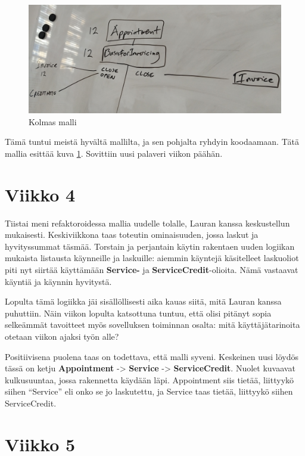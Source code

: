 \begin{figure}
\centering
\includegraphics[width=\textwidth,height=0.5\textheight]{illustration/malli3.jpg}
\caption{\label{malli3}Kolmas malli}
\end{figure}

Tämä tuntui meistä hyvältä mallilta, ja sen pohjalta ryhdyin koodaamaan.
Tätä mallia esittää kuva \ref{malli3}. Sovittiin uusi palaveri viikon
päähän.

\hypertarget{viikko-4}{%
\section{Viikko 4}\label{viikko-4}}

Tiistai meni refaktoroidessa mallia uudelle tolalle, Lauran kanssa
keskustellun mukaisesti. Keskiviikkona taas toteutin ominaisuuden, jossa
laskut ja hyvityssummat täsmää. Torstain ja perjantain käytin rakentaen
uuden logiikan mukaista listausta käynneille ja laskuille: aiemmin
käyntejä käsitelleet laskuoliot piti nyt siirtää käyttämään
\textbf{Service-} ja \textbf{ServiceCredit}-olioita. Nämä vastaavat
käyntiä ja käynnin hyvitystä.

Lopulta tämä logiikka jäi sisällöllisesti aika kauas siitä, mitä Lauran
kanssa puhuttiin. Näin viikon lopulta katsottuna tuntuu, että olisi
pitänyt sopia selkeämmät tavoitteet myös sovelluksen toiminnan osalta:
mitä käyttäjätarinoita otetaan viikon ajaksi työn alle?

Positiivisena puolena taas on todettava, että malli syveni. Keskeinen
uusi löydös tässä on ketju \textbf{Appointment} -\textgreater{}
\textbf{Service} -\textgreater{} \textbf{ServiceCredit}. Nuolet kuvaavat
kulkusuuntaa, jossa rakennetta käydään läpi. Appointment siis tietää,
liittyykö siihen ``Service'' eli onko se jo laskutettu, ja Service taas
tietää, liittyykö siihen ServiceCredit.

\hypertarget{viikko-5}{%
\section{Viikko 5}\label{viikko-5}}

